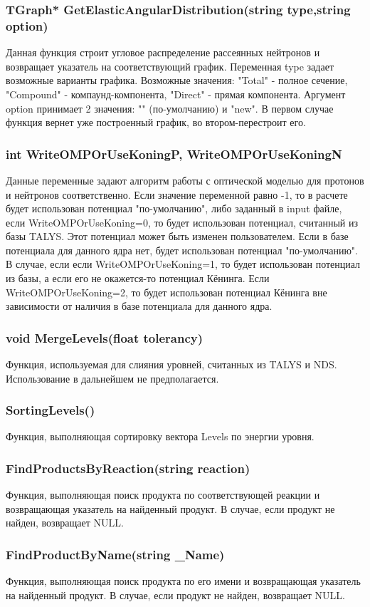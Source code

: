 \documentclass[a4paper,12pt]{extarticle}
\begin{document}
\subsubsection{TGraph* GetElasticAngularDistribution(string type,string option)}
Данная функция строит угловое распределение рассеянных нейтронов и возвращает указатель на соответствующий график. Переменная type задает возможные варианты графика. Возможные значения: "Total" - полное сечение, "Compound" - компаунд-компонента, "Direct" - прямая компонента. Аргумент option принимает 2 значения: "" (по-умолчанию) и "new". В первом случае функция вернет уже построенный график, во втором-перестроит его.
\subsubsection{int WriteOMPOrUseKoningP, WriteOMPOrUseKoningN}
Данные переменные задают алгоритм работы с оптической моделью для протонов и нейтронов соответственно. Если значение переменной равно -1, то в расчете будет использован потенциал "по-умолчанию", либо заданный в input файле, если WriteOMPOrUseKoning=0, то будет использован потенциал, считанный из базы TALYS. Этот потенциал может быть изменен пользователем. Если в базе потенциала для данного ядра нет, будет использован потенциал "по-умолчанию". В случае, если если WriteOMPOrUseKoning=1, то будет использован потенциал из базы, а если его не окажется-то потенциал Кёнинга. Если WriteOMPOrUseKoning=2, то будет использован потенциал Кёнинга вне зависимости от наличия в базе потенциала для данного ядра.
\subsubsection{void MergeLevels(float tolerancy)}
Функция, используемая для слияния уровней, считанных из TALYS и NDS. Использование в дальнейшем не предполагается.
\subsubsection{SortingLevels()}
Функция, выполняющая сортировку вектора Levels по энергии уровня. 
\subsubsection{FindProductsByReaction(string reaction)}
Функция, выполняющая поиск продукта по соответствующей реакции и возвращающая указатель на найденный продукт. В случае, если продукт не найден, возвращает NULL.
\subsubsection{FindProductByName(string _Name)}
Функция, выполняющая поиск продукта по его имени и возвращающая указатель на найденный продукт. В случае, если продукт не найден, возвращает NULL.
\end{document}
